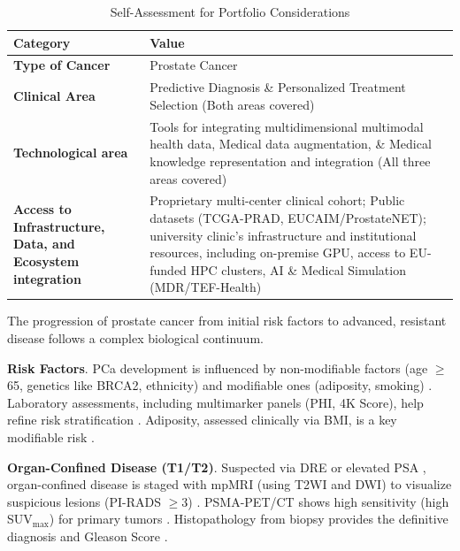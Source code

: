 \documentclass[11pt, a4paper]{article}
\begin{document}
\begin{table}[H]
    \centering
    \caption{Self-Assessment for Portfolio Considerations}
    \label{tab:portfolio_considerations}
    \small
    \begin{tabular}{p{} p{}}
        \toprule
        \textbf{Category} & \textbf{Value} \\
        \midrule
        \textbf{Type of Cancer} & Prostate Cancer \\
        \addlinespace
        \textbf{Clinical Area} & Predictive Diagnosis \& Personalized Treatment Selection (Both areas covered) \\
        \addlinespace
        \textbf{Technological area} & Tools for integrating multidimensional multimodal health data, Medical data augmentation, \& Medical knowledge representation and integration (All three areas covered) \\
        \addlinespace
        \textbf{Access to Infrastructure, Data, and Ecosystem integration} & Proprietary multi-center clinical cohort; Public datasets (TCGA-PRAD, EUCAIM/ProstateNET); university clinic’s infrastructure and institutional resources, including on-premise GPU, access to EU-funded HPC clusters, AI \& Medical Simulation (MDR/TEF-Health)\\
        \bottomrule
    \end{tabular}
\end{table}


The progression of prostate cancer from initial risk factors to advanced, resistant disease follows a complex biological continuum. 

\textbf{Risk Factors}. PCa development is influenced by non-modifiable factors (age $\geq$65, genetics like BRCA2, ethnicity) and modifiable ones (adiposity, smoking) \cite{PerezCornagoDunneram2022}. Laboratory assessments, including multimarker panels (PHI, 4K Score), help refine risk stratification \cite{ChenWang2023}. Adiposity, assessed clinically via BMI, is a key modifiable risk \cite{DickermanTorfadottir2019}.

\textbf{Organ-Confined Disease (T1/T2)}. Suspected via DRE or elevated PSA \cite{OliveiraFerreira2023}, organ-confined disease is staged with mpMRI (using T2WI and DWI) to visualize suspicious lesions (PI-RADS $\geq$3) \cite{OliveiraFerreira2023}. PSMA-PET/CT shows high sensitivity (high SUV$_{\text{max}}$) for primary tumors \cite{VetroneMei2023}. Histopathology from biopsy provides the definitive diagnosis and Gleason Score \cite{GhezzoBezzi2022}.
\end{document}
